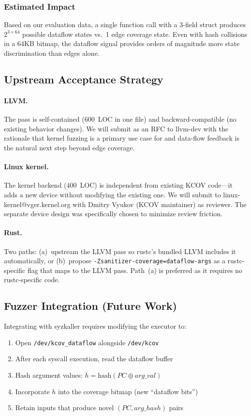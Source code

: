 \documentclass{ndss}
\begin{document}
\subsubsection{Estimated Impact}

Based on our evaluation data, a single function call with a 3-field struct
produces $2^{3 \times 64}$ possible dataflow states vs.\ 1 edge coverage state.
Even with hash collisions in a 64KB bitmap, the dataflow signal provides orders
of magnitude more state discrimination than edges alone.

\subsection{Upstream Acceptance Strategy}

\paragraph{LLVM.} The pass is self-contained (600~LOC in one file) and
backward-compatible (no existing behavior changes). We will submit as an RFC
to llvm-dev with the rationale that kernel fuzzing is a primary use case for
\sancov and data-flow feedback is the natural next step beyond edge coverage.

\paragraph{Linux kernel.} The kernel backend (400~LOC) is independent from
existing KCOV code---it adds a new device without modifying the existing one.
We will submit to linux-kernel@vger.kernel.org with Dmitry Vyukov (KCOV
maintainer) as reviewer. The separate device design was specifically chosen to
minimize review friction.

\paragraph{Rust.} Two paths: (a)~upstream the LLVM pass so rustc's bundled
LLVM includes it automatically, or (b)~propose
\texttt{-Zsanitizer-coverage=dataflow-args} as a rustc-specific flag that maps
to the LLVM pass. Path~(a) is preferred as it requires no rustc-specific code.

\subsection{Fuzzer Integration (Future Work)}

Integrating \toolname{} with syzkaller requires modifying the executor to:
\begin{enumerate}[nosep]
  \item Open \texttt{/dev/kcov\_dataflow} alongside \texttt{/dev/kcov}
  \item After each syscall execution, read the dataflow buffer
  \item Hash argument values: $h = \mathrm{hash}(\mathit{PC} \oplus
        \mathit{arg\_val})$
  \item Incorporate $h$ into the coverage bitmap (new ``dataflow bits'')
  \item Retain inputs that produce novel $(PC, arg\_hash)$ pairs
\end{enumerate}
\end{document}
